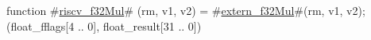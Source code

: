 function #\hyperref[sailRISCVzriscvzyf32Mul]{riscv\_f32Mul}# (rm, v1, v2) = {
  #\hyperref[sailRISCVzexternzyf32Mul]{extern\_f32Mul}#(rm, v1, v2);
  (float_fflags[4 .. 0], float_result[31 .. 0])
}
